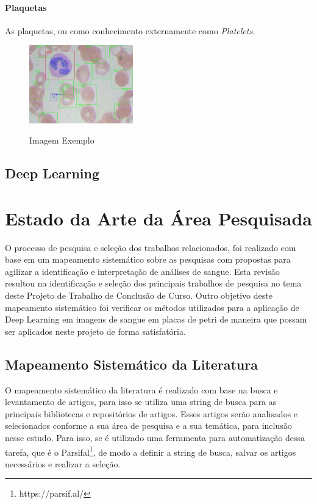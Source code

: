 \subsubsection{Plaquetas}
As plaquetas, ou como conhecimento externamente como \emph{Platelets}.

\begin{figure}[!htb]
    \centering
    \caption{Imagem Exemplo}
    \includegraphics[width=0.40\textwidth]{img/example.jpg}
    \label{fig:exemplo3}
 \end{figure}

\section{Deep Learning}
\label{sec:conceito2}

\chapter{Estado da Arte da Área Pesquisada}
\label{chap:mapeamento}

O processo de pesquisa e seleção dos trabalhos relacionados, foi realizado com base em um mapeamento sistemático sobre as pesquisas com propostas para agilizar a identificação e interpretação de análises de sangue. Esta revisão resultou na identificação e seleção dos principais trabalhos de pesquisa no tema deste Projeto de Trabalho de Conclusão de Curso. Outro objetivo deste mapeamento sistemático foi verificar os métodos utilizados para a aplicação de Deep Learning em imagens de sangue em placas de petri de maneira que possam ser aplicados neste projeto de forma satisfatória.

\section{Mapeamento Sistemático da Literatura}

O mapeamento sistemático da literatura é realizado com base na busca e levantamento de artigos, para isso se utiliza uma string de busca para as principais bibliotecas e repositórios de artigos. Esses artigos serão analisados e selecionados conforme a sua área de pesquisa e a sua temática, para inclusão nesse estudo. Para isso, se é utilizado uma ferramenta para automatização dessa tarefa, que é o Parsifal\footnote[1]{https://parsif.al/}, de modo a definir a string de busca, salvar os artigos necessários e realizar a seleção.

